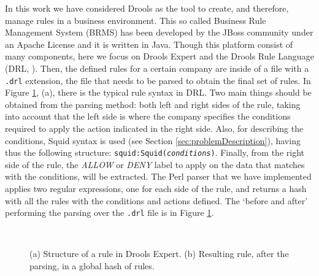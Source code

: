 \documentclass{llncs}
\begin{document}
\noindent In this work we have considered Drools \cite{drools:site}
as the tool to create, and therefore, manage rules in a business environment. This so called Business Rule Management System (BRMS) has been developed by the JBoss community under an Apache License and it is written in Java. Though this platform consist of many components, here we focus on Drools Expert and the Drools Rule Language (DRL, \cite{drools:doc}). Then, the defined rules for a certain company are inside of a file with a \texttt{.drl} extension, the file that needs to be parsed to obtain the final set of rules. In Figure \ref{fig:drools_hash}, (a), there is the typical rule syntax in DRL. Two main things should be obtained from the parsing method: both left and right sides of the rule, taking into account that the left side is where the company specifies the conditions required to apply the action indicated in the right side. Also, for describing the conditions, Squid syntax is used (see Section \ref{sec:problemDescription}), having thus the following structure: \texttt{squid:Squid(\textit{conditions})}. Finally, from the right side of the rule, the \textit{ALLOW} or \textit{DENY} label to apply on the data that matches with the conditions, will be extracted. The Perl parser that we have implemented applies two regular expressions, one for each side of the rule, and returns a hash with all the rules with the conditions and actions defined. The `before and after' performing the parsing over the \texttt{.drl} file is in Figure \ref{fig:drools_hash}.

\begin{figure}[htb]
\centering
{}
~
\caption{(a) Structure of a rule in Drools Expert. (b) Resulting rule, after the parsing, in a global hash of rules. \label{fig:drools_hash}}
\end{figure}
\end{document}
